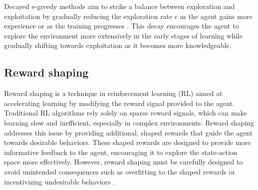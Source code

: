 Decayed e-greedy methods aim to strike a balance between exploration and exploitation by gradually reducing the exploration rate $\epsilon$ as the agent gains more experience or as the training progresses \cite{sutton2018reinforcement}. This decay encourages the agent to explore the environment more extensively in the early stages of learning while gradually shifting towards exploitation as it becomes more knowledgeable.

\subsection{Reward shaping}

Reward shaping is a technique in reinforcement learning (RL) aimed at accelerating learning by modifying the reward signal provided to the agent. Traditional RL algorithms rely solely on sparse reward signals, which can make learning slow and inefficient, especially in complex environments. Reward shaping addresses this issue by providing additional, shaped rewards that guide the agent towards desirable behaviors. These shaped rewards are designed to provide more informative feedback to the agent, encouraging it to explore the state-action space more effectively. However, reward shaping must be carefully designed to avoid unintended consequences such as overfitting to the shaped rewards or incentivizing undesirable behaviors \cite{russel2020ai}.
